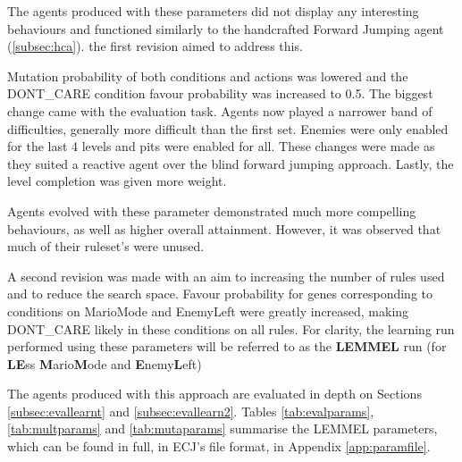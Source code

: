 The agents produced with these parameters did not display any interesting behaviours and functioned similarly to the handcrafted Forward Jumping agent (\ref{subsec:hca}). the first revision aimed to address this.

Mutation probability of both conditions and actions was lowered and the {\footnotesize DONT\_CARE} condition favour probability was increased to 0.5. The biggest change came with the evaluation task. Agents now played a narrower band of difficulties, generally more difficult than the first set. Enemies were only enabled for the last 4 levels and pits were enabled for all. These changes were made as they suited a reactive agent over the blind forward jumping approach. Lastly, the level completion was given more weight.

Agents evolved with these parameter demonstrated much more compelling behaviours, as well as higher overall attainment. However, it was observed that much of their ruleset's were unused.

A second revision was made with an aim to increasing the number of rules used and to reduce the search space. Favour probability for genes corresponding to conditions on MarioMode and EnemyLeft were greatly increased, making {\footnotesize DONT\_CARE} likely in these conditions on all rules. For clarity, the learning run performed using these parameters will be referred to as the \textbf{LEMMEL} run (for \textbf{LE}ss \textbf{M}ario\textbf{M}ode and \textbf{E}nemy\textbf{L}eft)

The agents produced with this approach are evaluated in depth on Sections \ref{subsec:evallearnt} and \ref{subsec:evallearn2}. Tables \ref{tab:evalparams}, \ref{tab:multparams} and \ref{tab:mutaparams} summarise the LEMMEL parameters, which can be found in full, in ECJ's file format, in Appendix \ref{app:paramfile}.

